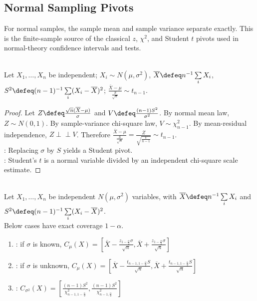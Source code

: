 \subsection{Normal Sampling Pivots}

For normal samples, the sample mean and sample variance separate exactly.  This is the finite-sample source of the classical $z$, $\chi^2$, and Student $t$ pivots used in normal-theory confidence intervals and tests.

\begin{corollary} \label{cor:normal-student-t-pivot} \\
Let $X_1,\ldots,X_n$ be independent; $X_i\sim N(\mu,\sigma^2)$, $\overline{X}\defeq n^{-1}\sum\limits_iX_i$, $S^2\defeq(n-1)^{-1}\sum\limits_i(X_i-\overline{X})^2$; $\frac{\overline{X}-\mu}{\frac{S}{\sqrt n}}\sim t_{n-1}$.
\begin{proof} Let $Z\defeq\frac{\sqrt n(\overline{X}-\mu)}{\sigma}$ and $V\defeq\frac{(n-1)S^2}{\sigma^2}$. By normal mean law, $Z\sim N(0,1)$. By sample-variance chi-square law, $V\sim\chi^2_{n-1}$. By mean-residual independence, $Z\perp\!\!\!\perp V$. Therefore $\frac{\overline{X}-\mu}{\frac{S}{\sqrt n}}=\frac{Z}{\sqrt{\frac{V}{n-1}}}\sim t_{n-1}$.\\
: Replacing $\sigma$ by $S$ yields a Student pivot.\\
: Student's $t$ is a normal variable divided by an independent chi-square scale estimate.
\end{proof}
\end{corollary}

\begin{method} \label{meth:normal-mean-exact-confidence-intervals} \\
Let $X_1,\ldots,X_n$ be independent $N(\mu,\sigma^2)$ variables, with $\overline{X}\defeq n^{-1}\sum\limits_iX_i$ and $S^2\defeq(n-1)^{-1}\sum\limits_i(X_i-\overline{X})^2$.\\
Below cases have exact coverage $1-\alpha$.
\begin{enumerate}[label=(\roman*)]
\setlength{\itemsep}{0pt}
\item {}: if $\sigma$ is known, $C_\mu(X)=[\overline{X}-\frac{z_{1-\frac{\alpha}{2}}\sigma}{\sqrt n},\overline{X}+\frac{z_{1-\frac{\alpha}{2}}\sigma}{\sqrt n}]$
\item {}: if $\sigma$ is unknown, $C_\mu(X)=[\overline{X}-\frac{t_{n-1,1-\frac{\alpha}{2}}S}{\sqrt n},\overline{X}+\frac{t_{n-1,1-\frac{\alpha}{2}}S}{\sqrt n}]$
\item {}: $C_{\sigma^2}(X)=[\frac{(n-1)S^2}{\chi^2_{n-1,1-\frac{\alpha}{2}}},\frac{(n-1)S^2}{\chi^2_{n-1,\frac{\alpha}{2}}}]$
\end{enumerate}
\end{method}

